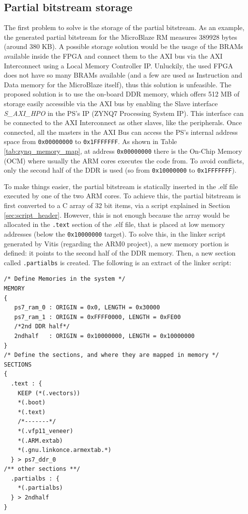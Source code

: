 \subsection{Partial bitstream storage}
The first problem to solve is the storage of the partial bitstream. As an example, the generated partial bitstream for the MicroBlaze RM measures 389928 bytes (around 380 KB). A possible storage solution would be the usage of the BRAMs available inside the FPGA and connect them to the AXI bus via the AXI Interconnect using a Local Memory Controller IP. Unluckily, the used FPGA does not have so many BRAMs available (and a few are used as Instruction and Data memory for the MicroBlaze itself), thus this solution is unfeasible. The proposed solution is to use the on-board DDR memory, which offers 512 MB of storage easily accessible via the AXI bus by enabling the Slave interface \textit{S\_AXI\_HPO} in the PS's IP (ZYNQ7 Processing System IP). This interface can be connected to the AXI Interconnect as other slaves, like the peripherals. Once connected, all the masters in the AXI Bus can access the PS's internal address space from \texttt{0x00000000} to \texttt{0x1FFFFFFF}. As shown in Table \ref{tab:zynq_memory_map}, at address \texttt{0x00000000} there is the On-Chip Memory (OCM) where usually the ARM cores executes the code from. To avoid conflicts, only the second half of the DDR is used (so from \texttt{0x10000000} to \texttt{0x1FFFFFFF}). \bigskip

To make things easier, the partial bitstream is statically inserted in the .elf file executed by one of the two ARM cores. To achieve this, the partial bitstream is first converted to a C array of 32 bit items, via a script explained in Section \ref{sec:script_header}. However, this is not enough because the array would be allocated in the \texttt{.text} section of the .elf file, that is placed at low memory addresses (below the \texttt{0x10000000} target). To solve this, in the linker script generated by Vitis (regarding the ARM0 project), a new memory portion is defined: it points to the second half of the DDR memory. Then, a new section called \texttt{.partialbs} is created. The following is an extract of the linker script:\bigskip

\begin{lstlisting}[style=preformatted]
/* Define Memories in the system */
MEMORY
{
   ps7_ram_0 : ORIGIN = 0x0, LENGTH = 0x30000
   ps7_ram_1 : ORIGIN = 0xFFFF0000, LENGTH = 0xFE00
   /*2nd DDR half*/
   2ndhalf	 : ORIGIN = 0x10000000, LENGTH = 0x10000000 
}
/* Define the sections, and where they are mapped in memory */
SECTIONS
{
  .text : {
    KEEP (*(.vectors))
    *(.boot)
    *(.text)
    /*-------*/
    *(.vfp11_veneer)
    *(.ARM.extab)
    *(.gnu.linkonce.armextab.*)
  } > ps7_ddr_0
/** other sections **/
  .partialbs : {
    *(.partialbs)
  } > 2ndhalf
}
\end{lstlisting}

